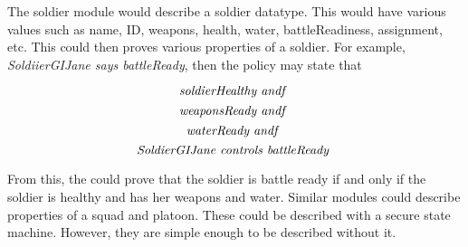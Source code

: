 \documentclass[../../main/main.tex]{subfiles}
\begin{document}
The soldier module would describe a soldier datatype.  This would have various values such as name, ID, weapons, health, water, battleReadiness, assignment, etc.   This could then proves various properties of a soldier.  For example,  \textit{SoldiierGIJane  says battleReady}, then the policy may state that


 \[ \text{\textit{soldierHealthy andf }} \] 
  \[ \text{\textit{weaponsReady andf }} \] 
 \[ \text{\textit{waterReady andf }} \] 
\[ \text{\textit{SoldierGIJane controls battleReady }} \]

From this, the  could prove that the soldier is battle ready if and only if the soldier is healthy and has her weapons and water.  Similar modules could describe properties of a squad and platoon.  These could be described with a secure state machine.  However, they are simple enough to be described without it.
\end{document}
